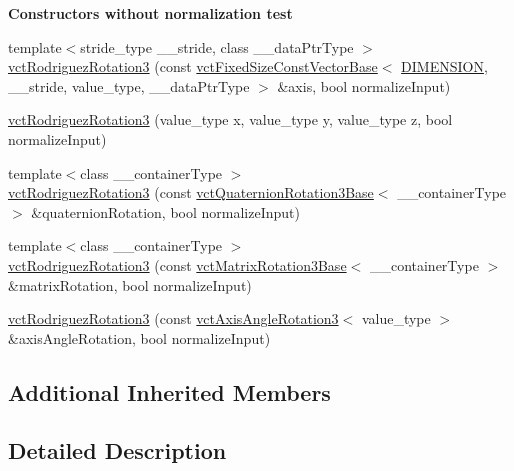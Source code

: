 \begin{Indent}{\bf Constructors without normalization test}
{\begin{DoxyItemize}
\end{DoxyItemize}}\begin{DoxyCompactItemize}
\item 
{\footnotesize template$<$stride\+\_\+type \+\_\+\+\_\+stride, class \+\_\+\+\_\+data\+Ptr\+Type $>$ }\\\hyperlink{classvct_rodriguez_rotation3_a9d9bc07dcca5a5a11d07c04e2438750e}{vct\+Rodriguez\+Rotation3} (const \hyperlink{classvct_fixed_size_const_vector_base}{vct\+Fixed\+Size\+Const\+Vector\+Base}$<$ \hyperlink{group__cisst_vector_gga7a58a7aa413585bc569bcf1f22656ae3a8bdaaaae91a14fa58479067f59ed9145}{D\+I\+M\+E\+N\+S\+I\+O\+N}, \+\_\+\+\_\+stride, value\+\_\+type, \+\_\+\+\_\+data\+Ptr\+Type $>$ \&axis, bool normalize\+Input)
\item 
\hyperlink{classvct_rodriguez_rotation3_a7d27c72e51b6e646bc59bb4dab64b0e3}{vct\+Rodriguez\+Rotation3} (value\+\_\+type x, value\+\_\+type y, value\+\_\+type z, bool normalize\+Input)
\item 
{\footnotesize template$<$class \+\_\+\+\_\+container\+Type $>$ }\\\hyperlink{classvct_rodriguez_rotation3_aea99f0057e9249cf2ce11745ef70ce32}{vct\+Rodriguez\+Rotation3} (const \hyperlink{classvct_quaternion_rotation3_base}{vct\+Quaternion\+Rotation3\+Base}$<$ \+\_\+\+\_\+container\+Type $>$ \&quaternion\+Rotation, bool normalize\+Input)
\item 
{\footnotesize template$<$class \+\_\+\+\_\+container\+Type $>$ }\\\hyperlink{classvct_rodriguez_rotation3_a7a20e70d05cb83743a38f483f6cd26f7}{vct\+Rodriguez\+Rotation3} (const \hyperlink{classvct_matrix_rotation3_base}{vct\+Matrix\+Rotation3\+Base}$<$ \+\_\+\+\_\+container\+Type $>$ \&matrix\+Rotation, bool normalize\+Input)
\item 
\hyperlink{classvct_rodriguez_rotation3_a7c6a9382f2e3547ee7e740bfb105d05e}{vct\+Rodriguez\+Rotation3} (const \hyperlink{classvct_axis_angle_rotation3}{vct\+Axis\+Angle\+Rotation3}$<$ value\+\_\+type $>$ \&axis\+Angle\+Rotation, bool normalize\+Input)
\end{DoxyCompactItemize}
\end{Indent}
\subsection*{Additional Inherited Members}


\subsection{Detailed Description}
